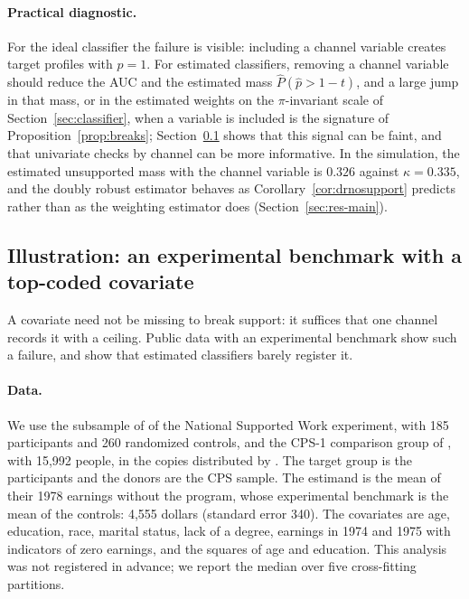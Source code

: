 \paragraph{Practical diagnostic.} For the ideal classifier the failure is visible: including a channel variable creates target profiles with $p=1$. For estimated classifiers, removing a channel variable should reduce the AUC and the estimated mass $\hat P(\hat p>1-t)$, and a large jump in that mass, or in the estimated weights on the $\pi$-invariant scale of Section~\ref{sec:classifier}, when a variable is included is the signature of Proposition~\ref{prop:breaks}; Section~\ref{sec:lalonde} shows that this signal can be faint, and that univariate checks by channel can be more informative. In the simulation, the estimated unsupported mass with the channel variable is $0.326$ against $\kappa=0.335$, and the doubly robust estimator behaves as Corollary~\ref{cor:drnosupport} predicts rather than as the weighting estimator does (Section~\ref{sec:res-main}).

\subsection{Illustration: an experimental benchmark with a top-coded covariate}\label{sec:lalonde}

A covariate need not be missing to break support: it suffices that one channel records it with a ceiling. Public data with an experimental benchmark show such a failure, and show that estimated classifiers barely register it.

\paragraph{Data.} We use the subsample of \citet{dehejia1999} of the National Supported Work experiment, with 185 participants and 260 randomized controls, and the CPS-1 comparison group of \citet{lalonde1986}, with 15{,}992 people, in the copies distributed by \citet{cunningham2021}. The target group is the participants and the donors are the CPS sample. The estimand is the mean of their 1978 earnings without the program, whose experimental benchmark is the mean of the controls: 4{,}555 dollars (standard error 340). The covariates are age, education, race, marital status, lack of a degree, earnings in 1974 and 1975 with indicators of zero earnings, and the squares of age and education. This analysis was not registered in advance; we report the median over five cross-fitting partitions.

